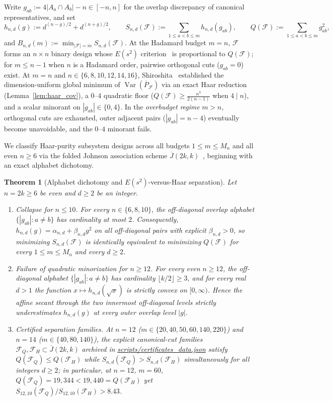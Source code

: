 \documentclass[11pt,reqno]{amsart}
\newtheorem{theorem}{Theorem}
\theoremstyle{definition}
\theoremstyle{remark}
\newcommand{\Var}{\operatorname{Var}}
\newcommand{\Jbar}{\overline{J}}
\newcommand{\F}{\mathcal{F}}
\begin{document}
Write $g_{ab} := 4|A_a \cap A_b| - n \in [-n, n]$ for the overlap discrepancy of canonical representatives, and set
\begin{equation}\label{eq:S_def}
h_{n,d}(g) := d^{(n-g)/2} + d^{(n+g)/2}, \qquad S_{n,d}(\F) := \sum_{1 \le a < b \le m} h_{n,d}(g_{ab}), \qquad Q(\F) := \sum_{1 \le a < b \le m} g_{ab}^2,
\end{equation}
and $B_{n,d}(m) := \min_{|\F|=m} S_{n,d}(\F)$. At the Hadamard budget $m = n$, $\F$ forms an $n \times n$ binary design whose $E(s^2)$ criterion~\cite{BoothCox1962} is proportional to $Q(\F)$; for $m \le n-1$ when $n$ is a Hadamard order, pairwise orthogonal cuts ($g_{ab}=0$) exist. At $m = n$ and $n \in \{6,8,10,12,14,16\}$, Shiroshita~\cite{Shiroshita2026} established the dimension-uniform global minimum of $\Var(\overline{P}_{\F})$ via an exact Haar reduction (Lemma~\ref{lem:haar_cov}), a $0$--$4$ quadratic floor ($Q(\F) \ge \frac{n^3}{2(n-1)}$ when $4 \mid n$), and a scalar minorant on $|g_{ab}| \in \{0,4\}$. In the \emph{overbudget regime} $m > n$, orthogonal cuts are exhausted, outer adjacent pairs ($|g_{ab}| = n-4$) eventually become unavoidable, and the $0$--$4$ minorant fails.

We classify Haar-purity subsystem designs across all budgets $1 \le m \le M_n$ and all even $n \ge 6$ via the folded Johnson association scheme $\Jbar(2k,k)$~\cite{Delsarte1973,BannaiIto1984}, beginning with an exact alphabet dichotomy.

\begin{theorem}[Alphabet dichotomy and $E(s^2)$-versus-Haar separation]\label{thm:separation}
Let $n = 2k \ge 6$ be even and $d \ge 2$ be an integer.
\begin{enumerate}
\item[(a)] \emph{Collapse for $n \le 10$.} For every $n \in \{6,8,10\}$, the off-diagonal overlap alphabet $\{|g_{ab}| : a \ne b\}$ has cardinality at most $2$. Consequently, $h_{n,d}(g) = \alpha_{n,d} + \beta_{n,d} g^2$ on all off-diagonal pairs with explicit $\beta_{n,d} > 0$, so minimizing $S_{n,d}(\F)$ is identically equivalent to minimizing $Q(\F)$ for every $1 \le m \le M_n$ and every $d \ge 2$.
\item[(b)] \emph{Failure of quadratic minorization for $n \ge 12$.} For every even $n \ge 12$, the off-diagonal alphabet $\{|g_{ab}| : a \ne b\}$ has cardinality $\lfloor k/2 \rfloor \ge 3$, and for every real $d > 1$ the function $x \mapsto h_{n,d}(\sqrt{x})$ is strictly convex on $[0,\infty)$. Hence the affine secant through the two innermost off-diagonal levels strictly underestimates $h_{n,d}(g)$ at every outer overlap level $|g|$.
\item[(c)] \emph{Certified separation families.} At $n=12$ ($m \in \{20,40,50,60,140,220\}$) and $n=14$ ($m \in \{40,80,140\}$), the explicit canonical-cut families $\F_Q, \F_H \subset \Jbar(2k,k)$ archived in \url{scripts/certificates_data.json} satisfy $Q(\F_Q) \le Q(\F_H)$ while $S_{n,d}(\F_Q) > S_{n,d}(\F_H)$ simultaneously for \emph{all} integers $d \ge 2$; in particular, at $n=12$, $m=60$, $Q(\F_Q) = 19{,}344 < 19{,}440 = Q(\F_H)$ yet $S_{12,10}(\F_Q)/S_{12,10}(\F_H) > 8.43$.
\end{enumerate}
\end{theorem}
\end{document}
